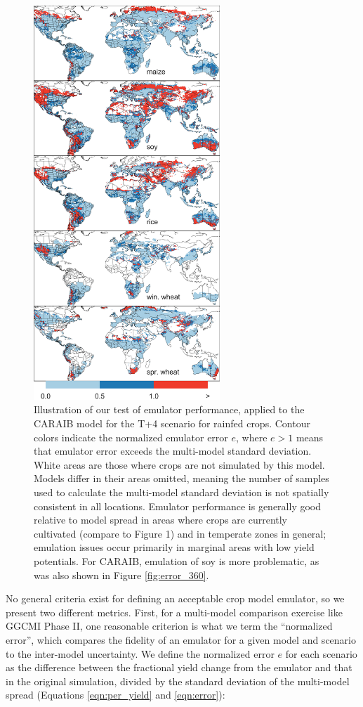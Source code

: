 \documentclass[gmd, manuscript]{copernicus} %
\begin{document}
\begin{figure}[ht]
\centering
    \includegraphics[width=7cm]{figures/em_err.png}
    \caption{Illustration of our test of emulator performance, applied to the CARAIB model for the T+4 scenario for rainfed crops. Contour colors indicate the normalized emulator error $e$, where $e > 1$ means that emulator error exceeds the multi-model standard deviation. White areas are those where crops are not simulated by this model. Models differ in their areas omitted, meaning the number of samples used to calculate the multi-model standard deviation is not spatially consistent in all locations. Emulator performance is generally good relative to model spread in areas where crops are currently cultivated (compare to Figure 1) and in temperate zones in general; emulation issues occur primarily in marginal areas with low yield potentials. For CARAIB, emulation of soy is more problematic, as was also shown in Figure \ref{fig:error_360}.}
   \label{fig:error}
\end{figure}

No general criteria exist for defining an acceptable crop model emulator, so we present two different metrics. First, for a multi-model comparison exercise like GGCMI Phase II, one reasonable criterion is what we term the ``normalized error'', which compares the fidelity of an emulator for a given model and scenario to the inter-model uncertainty. We define the normalized error $e$ for each scenario as the difference between the fractional yield change from the emulator and that in the original simulation, divided by the standard deviation of the multi-model spread (Equations \ref{eqn:per_yield} and  \ref{eqn:error}):
\end{document}
